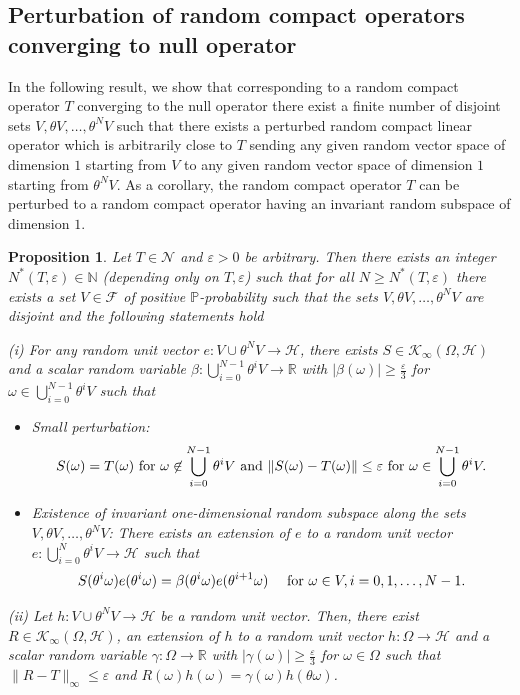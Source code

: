 \documentclass[pdflatex,sn-mathphys-num]{sn-jnl}%
\theoremstyle{thmstyleone}%
\newtheorem{proposition}[theorem]{Proposition}%
\theoremstyle{thmstyletwo}%
\theoremstyle{thmstylethree}%
\newcommand{\N}{\mathbb{N}}
\newcommand{\R}{\mathbb{R}}
\newcommand{\mP}{\mathbb{P}}
\newcommand{\cH}{\mathcal{H}}
\newcommand{\cK}{\mathcal{K}}
\newcommand{\eps}{\varepsilon}
\numberwithin{equation}{section}
\begin{document}
\subsection{Perturbation of random compact operators converging to null operator}\label{Subsection3.2}
%
%
In the following result, we show that corresponding to a random compact operator $T$ converging to the null operator there exist a finite number of disjoint sets $V,\theta V,\dots,\theta^N V$  such that there exists a perturbed random compact linear operator which is arbitrarily close to $T$ sending any given random vector space of dimension $1$  starting from $V$ to any given random vector space of dimension $1$  starting from $\theta^N V$. As a corollary, the random compact operator $T$ can be perturbed to a random compact operator having an invariant random subspace of dimension $1$.
%
%
%
\begin{proposition}\label{TechnicalProposition_1} Let $T\in\mathcal N$ and $\eps>0$ be arbitrary. Then  there exists an integer $N^*(T,\eps)\in\N$ (depending only on $T,\eps$) such that for all $N\geq N^*(T,\eps)$ there exists  a set $V\in\mathcal F$ of positive $\mP$-probability such that the sets $V,\theta V,\dots, \theta^N V$ are disjoint and the following statements hold

\noindent
(i) For any random unit vector $e:V\cup \theta^N V\rightarrow \mathcal H$, there exists $S\in\mathcal K_{\infty}(\Omega,\mathcal H)$ and a scalar random variable $\beta:\bigcup_{i=0}^{N-1}\theta^i V\rightarrow\R$ with $|\beta(\omega)|\geq \frac{\eps}{3}$ for $\omega\in \bigcup_{i=0}^{N-1}\theta^i V$ such that 
\begin{itemize}
\item [(p1)] \emph{Small perturbation}:
\[
S(\omega)=T(\omega)\hbox{ for } \omega\not\in \bigcup_{i=0}^{N-1}\theta^i V
\hbox{ and } \|S(\omega)- T(\omega)\|\leq \eps\hbox{ for } \omega\in \bigcup_{i=0}^{N-1}\theta^i V.	
\]
\item [(p2)] \emph{Existence of invariant one-dimensional random subspace along the sets $V,\theta V,\dots, \theta^N V$}: There exists an extension of $e$ to a random unit vector $e:\bigcup_{i=0}^N\theta^i V\rightarrow \cH$ such that
\[
S(\theta^i\omega)e(\theta^i\omega)=\beta(\theta^i\omega)e(\theta^{i+1}\omega)\quad \hbox{ for } \omega\in V, i=0,1,\dots,N-1.
\]
\end{itemize}

\noindent 
(ii) Let  $h:V\cup\theta^N V\rightarrow \cH$ be a random unit vector. Then, there exist $R \in \cK_{\infty}(\Omega,\cH)$, an extension of $h$ to a random unit vector $h:\Omega\rightarrow \cH$ and a scalar random variable $\gamma:\Omega\rightarrow \mathbb R$ with $|\gamma(\omega)|\geq \frac{\eps}{3}$ for $\omega\in\Omega$ such that $\|R-T\|_{\infty}\leq \eps$ and $R(\omega) h(\omega)=\gamma(\omega)h(\theta\omega)$.



\end{proposition}
\end{document}

